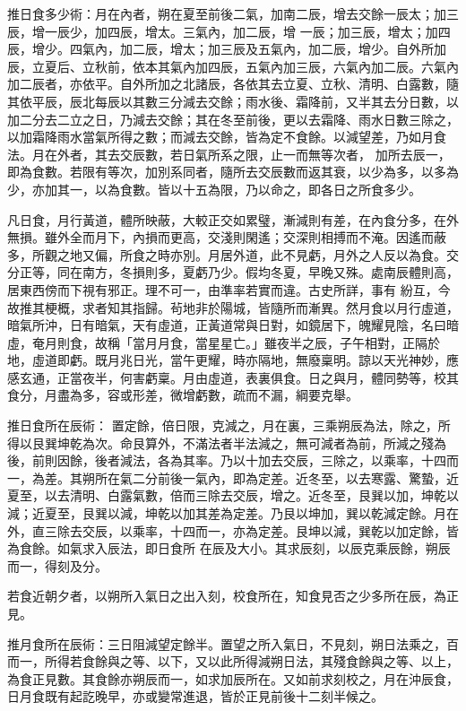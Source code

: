 \begin{pinyinscope}
 推日食多少術：月在內者，朔在夏至前後二氣，加南二辰，增去交餘一辰太；加三辰，增一辰少，加四辰，增太。三氣內，加二辰，增
 一辰；加三辰，增太；加四辰，增少。四氣內，加二辰，增太；加三辰及五氣內，加二辰，增少。自外所加辰，立夏后、立秋前，依本其氣內加四辰，五氣內加三辰，六氣內加二辰。六氣內加二辰者，亦依平。自外所加之北諸辰，各依其去立夏、立秋、清明、白露數，隨其依平辰，辰北每辰以其數三分減去交餘；雨水後、霜降前，又半其去分日數，以加二分去二立之日，乃減去交餘；其在冬至前後，更以去霜降、雨水日數三除之，以加霜降雨水當氣所得之數；而減去交餘，皆為定不食餘。以減望差，乃如月食法。月在外者，其去交辰數，若日氣所系之限，止一而無等次者，
 加所去辰一，即為食數。若限有等次，加別系同者，隨所去交辰數而返其衰，以少為多，以多為少，亦加其一，以為食數。皆以十五為限，乃以命之，即各日之所食多少。



 凡日食，月行黃道，體所映蔽，大較正交如累璧，漸減則有差，在內食分多，在外無損。雖外全而月下，內損而更高，交淺則閑遙；交深則相搏而不淹。因遙而蔽多，所觀之地又偏，所食之時亦別。月居外道，此不見虧，月外之人反以為食。交分正等，同在南方，冬損則多，夏虧乃少。假均冬夏，早晚又殊。處南辰體則高，居東西傍而下視有邪正。理不可一，由準率若實而違。古史所詳，事有
 紛互，今故推其梗概，求者知其指歸。茍地非於陽城，皆隨所而漸異。然月食以月行虛道，暗氣所沖，日有暗氣，天有虛道，正黃道常與日對，如鏡居下，魄耀見陰，名曰暗虛，奄月則食，故稱「當月月食，當星星亡。」雖夜半之辰，子午相對，正隔於地，虛道即虧。既月兆日光，當午更耀，時亦隔地，無廢稟明。諒以天光神妙，應感玄通，正當夜半，何害虧稟。月由虛道，表裏俱食。日之與月，體同勢等，校其食分，月盡為多，容或形差，微增虧數，疏而不漏，綱要克舉。



 推日食所在辰術：
 置定餘，倍日限，克減之，月在裏，三乘朔辰為法，除之，所得以艮巽坤乾為次。命艮算外，不滿法者半法減之，無可減者為前，所減之殘為後，前則因餘，後者減法，各為其率。乃以十加去交辰，三除之，以乘率，十四而一，為差。其朔所在氣二分前後一氣內，即為定差。近冬至，以去寒露、驚蟄，近夏至，以去清明、白露氣數，倍而三除去交辰，增之。近冬至，艮巽以加，坤乾以減；近夏至，艮巽以減，坤乾以加其差為定差。乃艮以坤加，巽以乾減定餘。月在外，直三除去交辰，以乘率，十四而一，亦為定差。艮坤以減，巽乾以加定餘，皆為食餘。如氣求入辰法，即日食所
 在辰及大小。其求辰刻，以辰克乘辰餘，朔辰而一，得刻及分。



 若食近朝夕者，以朔所入氣日之出入刻，校食所在，知食見否之少多所在辰，為正見。



 推月食所在辰術：三日阻減望定餘半。置望之所入氣日，不見刻，朔日法乘之，百而一，所得若食餘與之等、以下，又以此所得減朔日法，其殘食餘與之等、以上，為食正見數。其食餘亦朔辰而一，如求加辰所在。又如前求刻校之，月在沖辰食，日月食既有起訖晚早，亦或變常進退，皆於正見前後十二刻半候之。




\end{pinyinscope}
